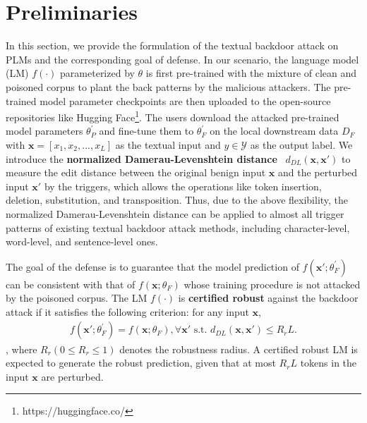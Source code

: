\section{Preliminaries}
In this section, we provide the formulation of the textual backdoor attack on PLMs and the corresponding goal of defense. In our scenario, the language model (LM) $f(\cdot)$ parameterized by $\theta$ is first pre-trained with the mixture of clean and poisoned corpus to plant the back patterns by the malicious attackers. The pre-trained model parameter checkpoints are then uploaded to the open-source repositories like Hugging Face\footnote{https://huggingface.co/}.
The users download the attacked pre-trained model parameters $\theta^{'}_P$ and fine-tune them to $\theta^{'}_F$ on the local downstream data $D_F$ with $\mathbf{x} = [x_1, x_2, ..., x_L]$ as the textual input and $y \in \mathcal{Y}$ as the output label. We introduce the \textbf{normalized Damerau-Levenshtein distance}~\citep{damerau1964technique, levenshtein1966binary} $d_{DL}(\mathbf{x}, \mathbf{x}')$ to measure the edit distance between the original benign input $\mathbf{x}$ and the perturbed input $\mathbf{x}'$ by the triggers, which allows the operations like token insertion, deletion, substitution, and transposition. Thus, due to the above flexibility, the normalized Damerau-Levenshtein distance can be applied to almost all trigger patterns of existing textual backdoor attack methods, including character-level, word-level, and sentence-level ones. 

The goal of the defense is to guarantee that the model prediction of $f(\mathbf{x}';\theta^{'}_F)$ can be consistent with that of $f(\mathbf{x};\theta_F)$ whose training procedure is not attacked by the poisoned corpus. The LM $f(\cdot)$ is \textbf{certified robust} against the backdoor attack if it satisfies the following criterion: for any input $\mathbf{x}$,
\begin{equation}
\begin{aligned}
f(\mathbf{x}';\theta^{'}_F) = f(\mathbf{x};\theta_F), \forall \mathbf{x}' \text{ s.t. } d_{DL}(\mathbf{x}, \mathbf{x}') \leq R_r L.
\end{aligned}
\label{eq:certified robustness}
\end{equation}
, where $R_r (0 \leq R_r \leq 1)$ denotes the robustness radius. A certified robust LM  is expected to generate the robust prediction, given that at most $R_r L$ tokens in the input $\mathbf{x}$ are perturbed.